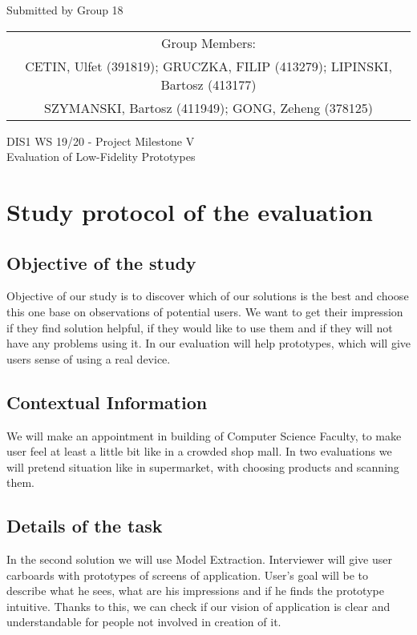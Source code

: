 \documentclass[a4paper,10pt,oneside]{scrreprt}
\begin{document}
\begin{center}
	Submitted by Group 18

	\bigskip

	\begin{tabular}{c}
	Group Members: \\
	CETIN, Ulfet (391819); GRUCZKA, FILIP (413279);	LIPINSKI, Bartosz (413177) \\
	SZYMANSKI, Bartosz (411949); GONG, Zeheng (378125)\\
	\end{tabular}

	\bigskip

	DIS1 WS 19/20 - Project Milestone V\\
	Evaluation of Low-Fidelity Prototypes\\

\end{center}
\vspace{-1cm}

\clearpage

\begingroup
\let\clearpage\relax
	\chapter{Study protocol of the evaluation}
\endgroup


\section{Objective of the study}
Objective of our study is to discover which of our solutions is the best and choose this one base on observations of potential users. We want to get their impression if they find solution helpful, if they would like to use them and if they will not have any problems using it. In our evaluation will help prototypes, which will give users sense of using a real device.



\section{Contextual Information}
We will make an appointment in building of Computer Science Faculty, to make user feel at least a little bit like in a crowded shop mall. In two evaluations we will pretend situation like in supermarket, with choosing products and scanning them. 


\section{Details of the task}
In the second solution we will use Model Extraction. Interviewer will give user carboards with prototypes of screens of application. User's goal will be to describe what he sees, what are his impressions and if he finds the prototype intuitive. Thanks to this, we can check if our vision of application is clear and understandable for people not involved in creation of it.
\end{document}
